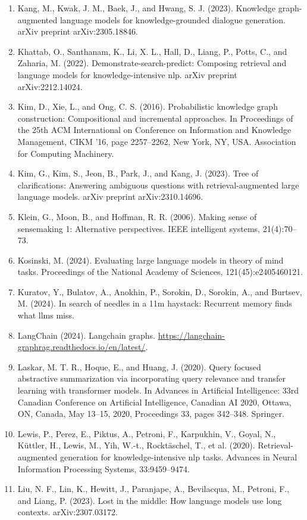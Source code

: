 \documentclass[11pt,UTF8,fontset=fandol]{ctexart}
\begin{document}
\begin{enumerate}[leftmargin=2em]
\item Kang, M., Kwak, J. M., Baek, J., and Hwang, S. J. (2023). Knowledge graph-augmented language models for knowledge-grounded dialogue generation. arXiv preprint arXiv:2305.18846.
\item Khattab, O., Santhanam, K., Li, X. L., Hall, D., Liang, P., Potts, C., and Zaharia, M. (2022). Demonstrate-search-predict: Composing retrieval and language models for knowledge-intensive nlp. arXiv preprint arXiv:2212.14024.
\item Kim, D., Xie, L., and Ong, C. S. (2016). Probabilistic knowledge graph construction: Compositional and incremental approaches. In Proceedings of the 25th ACM International on Conference on Information and Knowledge Management, CIKM '16, page 2257--2262, New York, NY, USA. Association for Computing Machinery.
\item Kim, G., Kim, S., Jeon, B., Park, J., and Kang, J. (2023). Tree of clarifications: Answering ambiguous questions with retrieval-augmented large language models. arXiv preprint arXiv:2310.14696.
\item Klein, G., Moon, B., and Hoffman, R. R. (2006). Making sense of sensemaking 1: Alternative perspectives. IEEE intelligent systems, 21(4):70--73.
\item Kosinski, M. (2024). Evaluating large language models in theory of mind tasks. Proceedings of the National Academy of Sciences, 121(45):e2405460121.
\item Kuratov, Y., Bulatov, A., Anokhin, P., Sorokin, D., Sorokin, A., and Burtsev, M. (2024). In search of needles in a 11m haystack: Recurrent memory finds what llms miss.
\item LangChain (2024). Langchain graphs. \url{https://langchain-graphrag.readthedocs.io/en/latest/}.
\item Laskar, M. T. R., Hoque, E., and Huang, J. (2020). Query focused abstractive summarization via incorporating query relevance and transfer learning with transformer models. In Advances in Artificial Intelligence: 33rd Canadian Conference on Artificial Intelligence, Canadian AI 2020, Ottawa, ON, Canada, May 13--15, 2020, Proceedings 33, pages 342--348. Springer.
\item Lewis, P., Perez, E., Piktus, A., Petroni, F., Karpukhin, V., Goyal, N., K\"uttler, H., Lewis, M., Yih, W.-t., Rockt\"aschel, T., et al. (2020). Retrieval-augmented generation for knowledge-intensive nlp tasks. Advances in Neural Information Processing Systems, 33:9459--9474.
\item Liu, N. F., Lin, K., Hewitt, J., Paranjape, A., Bevilacqua, M., Petroni, F., and Liang, P. (2023). Lost in the middle: How language models use long contexts. arXiv:2307.03172.

\end{enumerate}
\end{document}

